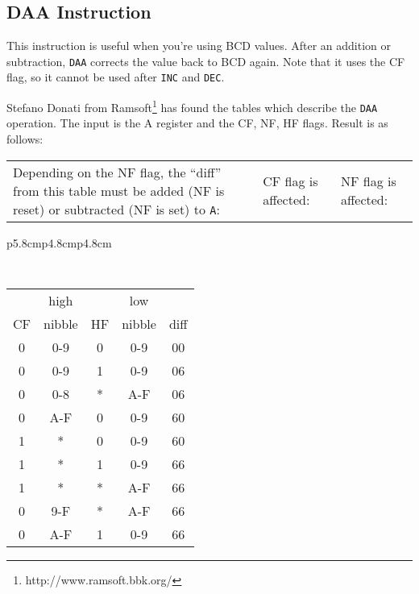 \documentclass[12pt,twoside,openright,a4paper]{book}
\begin{document}
\subsection{DAA Instruction}
\label{daa}

This instruction is useful when you're using BCD values. After an addition or subtraction, {\tt DAA} corrects the value back to BCD again.  Note that it uses the CF flag, so it cannot be used after {\tt INC} and {\tt DEC}.

Stefano Donati from Ramsoft\footnote{http://www.ramsoft.bbk.org/} has found the tables which describe the {\tt DAA} operation. The input is the A register and the CF, NF, HF flags. Result is as follows:

{
	\footnotesize

	\begin{tabular}{b{5.8cm}b{4.8cm}b{4.8cm}}
		Depending on the NF flag, the ``diff'' from this table must be added (NF is reset) or subtracted (NF is set) to {\tt A}:
		&
		CF flag is affected:
		&
		NF flag is affected: \\
	\end{tabular}

	\begin{tabular}{p{5.8cm}p{4.8cm}p{4.8cm}}

		{\tt
			\begin{tabular}[t]{c|c|c|c|c}
				   &  high   &    & low    &  \\
				CF &  nibble & HF & nibble & diff \\
				\hline
				0 & 0-9     &  0 & 0-9    &  00  \\
				0 & 0-9     &  1 & 0-9    &  06  \\
				0 & 0-8     &  * & A-F    &  06  \\
				0 & A-F     &  0 & 0-9    &  60  \\
				1 &  *      &  0 & 0-9    &  60  \\
				1 &  *      &  1 & 0-9    &  66  \\
				1 &  *      &  * & A-F    &  66  \\
				0 & 9-F     &  * & A-F    &  66  \\
				0 & A-F     &  1 & 0-9    &  66  \\
				\hline
			\end{tabular}
		}


\end{tabular}}
\end{document}
